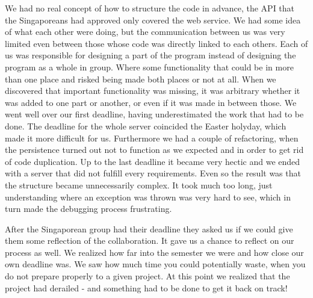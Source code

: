 We had no real concept of how to structure the code in advance, the API that the Singaporeans had approved only covered the web service. We had some idea of what each other were doing, but the communication between us was very limited even between those whose code was directly linked to each others. Each of us was responsible for designing a part of the program instead of designing the program as a whole in group. Where some functionality that could be in more than one place and risked being made both places or not at all. When we discovered that important functionality was missing, it was arbitrary whether it was added to one part or another, or even if it was made in between those. We went well over our first deadline, having underestimated the work that had to be done. The deadline for the whole server coincided the Easter holyday, which made it more difficult for us. Furthermore we had a couple of refactoring, when the persistence turned out not to function as we expected and in order to get rid of code duplication. Up to the last deadline it became very hectic and we ended with a server that did not fulfill every requirements. Even so the result was that the structure became unnecessarily complex. It took much too long, just understanding where an exception was thrown was very hard to see, which in turn made the debugging process frustrating.

After the Singaporean group had their deadline they asked us if we could give them some reflection of the collaboration. It gave us a chance to reflect on our process as well. We realized how far into the semester we were and how close our own deadline was. We saw how much time you could potentially waste, when you do not prepare properly to a given project. At this point we realized that the project had derailed - and something had to be done to get it back on track!
\newpage